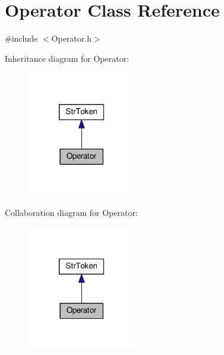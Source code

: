 \hypertarget{class_operator}{\section{Operator Class Reference}
\label{class_operator}
}


{\ttfamily \#include $<$Operator.\-h$>$}



Inheritance diagram for Operator\-:\nopagebreak
\begin{figure}[H]
\begin{center}
\leavevmode
\includegraphics[width=134pt]{class_operator__inherit__graph}
\end{center}
\end{figure}


Collaboration diagram for Operator\-:\nopagebreak
\begin{figure}[H]
\begin{center}
\leavevmode
\includegraphics[width=134pt]{class_operator__coll__graph}
\end{center}
\end{figure}
